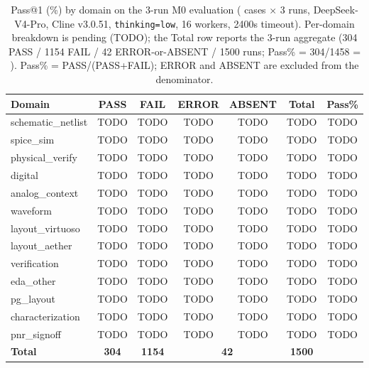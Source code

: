 \begin{table}[ht]
\centering
\small
\caption{Pass@1 (\%) by domain on the 3-run M0 evaluation (\Ncases{} cases $\times$ 3 runs, DeepSeek-V4-Pro, Cline v3.0.51, \texttt{thinking=low}, 16 workers, 2400s timeout). Per-domain breakdown is pending (TODO); the Total row reports the 3-run aggregate (304 PASS / 1154 FAIL / 42 ERROR-or-ABSENT / 1500 runs; Pass\% = 304/1458 = \MzeroPass{}). Pass\% = PASS/(PASS+FAIL); ERROR and ABSENT are excluded from the denominator.}
\label{tab:full-domain-results}
\scriptsize
\setlength{\tabcolsep}{4pt}
\begin{tabular}{@{}lcccccc@{}}
\toprule
\textbf{Domain} & \textbf{PASS} & \textbf{FAIL} & \textbf{ERROR} & \textbf{ABSENT} & \textbf{Total} & \textbf{Pass\%} \\
\midrule
schematic\_netlist & TODO & TODO & TODO & TODO & TODO & TODO \\
spice\_sim         & TODO & TODO & TODO & TODO & TODO & TODO \\
physical\_verify   & TODO & TODO & TODO & TODO & TODO & TODO \\
digital            & TODO & TODO & TODO & TODO & TODO & TODO \\
analog\_context    & TODO & TODO & TODO & TODO & TODO & TODO \\
waveform           & TODO & TODO & TODO & TODO & TODO & TODO \\
layout\_virtuoso   & TODO & TODO & TODO & TODO & TODO & TODO \\
layout\_aether     & TODO & TODO & TODO & TODO & TODO & TODO \\
verification       & TODO & TODO & TODO & TODO & TODO & TODO \\
eda\_other         & TODO & TODO & TODO & TODO & TODO & TODO \\
pg\_layout         & TODO & TODO & TODO & TODO & TODO & TODO \\
characterization   & TODO & TODO & TODO & TODO & TODO & TODO \\
pnr\_signoff       & TODO & TODO & TODO & TODO & TODO & TODO \\
\midrule
\textbf{Total}     & \textbf{304} & \textbf{1154} & \multicolumn{2}{c}{\textbf{42}} & \textbf{1500} & \textbf{\MzeroPass{}} \\
\bottomrule
\end{tabular}
\end{table}


